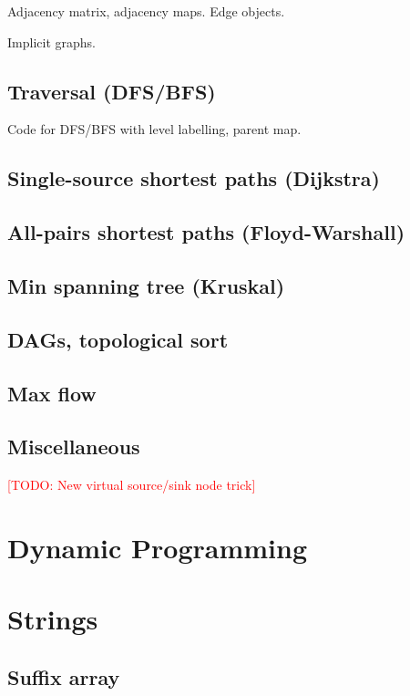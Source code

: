 \documentclass[10pt]{book}
\newcommand{\todo}[1]{\textcolor{red}{[TODO: #1]}}
\begin{document}
  Adjacency matrix, adjacency maps.  Edge objects.

  Implicit graphs.

\section{Traversal (DFS/BFS)}

Code for DFS/BFS with level labelling, parent map.

\section{Single-source shortest paths (Dijkstra)}

\section{All-pairs shortest paths (Floyd-Warshall)}

\section{Min spanning tree (Kruskal)} \label{sec:kruskal}

\section{DAGs, topological sort}

\section{Max flow}

\section{Miscellaneous}

\todo{New virtual source/sink node trick}

\chapter{Dynamic Programming}

\chapter{Strings}

\section{Suffix array}
\end{document}
